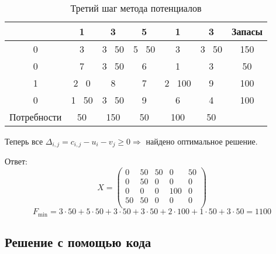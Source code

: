 \documentclass[17pt]{extarticle}
\begin{document}
\begin{table}[h!]
    \centering
    \begin{tabular}{c|ccccc|c}
        \toprule
                    & 1      & 3      & 5      & 1       & 3      & Запасы \\
        \midrule
        0           & 3      & 3 \ 50 & 5 \ 50 & 3       & 3 \ 50 & 150    \\
        0           & 7      & 3 \ 50 & 6      & 1       & 3      & 50     \\
        1           & 2 \ 0  & 8      & 7      & 2 \ 100 & 9      & 100    \\
        0           & 1 \ 50 & 3 \ 50 & 9      & 6       & 4      & 100    \\
        \midrule
        Потребности & 50     & 150    & 50     & 100     & 50     &        \\
        \bottomrule
    \end{tabular}
    \caption{Третий шаг метода потенциалов}
\end{table}

Теперь все \(\Delta_{i,j} = c_{i,j} - u_i - v_j \geq 0 \Rightarrow\)  найдено оптимальное решение.

Ответ:
\[
    X =
    \begin{pmatrix}
        0  & 50 & 50 & 0   & 50 \\
        0  & 50 & 0  & 0   & 0  \\
        0  & 0  & 0  & 100 & 0  \\
        50 & 50 & 0  & 0   & 0  \\
    \end{pmatrix}
\]
\[
    F_{\text{min}} = 3 \cdot 50 + 5 \cdot 50 + 3 \cdot 50 + 3 \cdot 50 + 2 \cdot 100 + 1 \cdot 50 + 3 \cdot 50 = 1100
\]

\subsection*{Решение с помощью кода}
\end{document}

